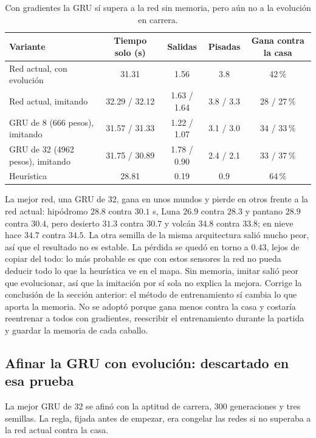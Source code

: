 \documentclass[11pt,letterpaper]{article}
\begin{document}
\begin{table}[h]\centering\small
\begin{tabular}{lcccc}
\toprule
Variante & Tiempo solo (s) & Salidas & Pisadas & Gana contra la casa \\
\midrule
Red actual, con evolución & 31.31 & 1.56 & 3.8 & 42\,\% \\
Red actual, imitando & 32.29 / 32.12 & 1.63 / 1.64 & 3.8 / 3.3 & 28 / 27\,\% \\
GRU de 8 (666 pesos), imitando & 31.57 / 31.33 & 1.22 / 1.07 & 3.1 / 3.0 & 34 / 33\,\% \\
GRU de 32 (4962 pesos), imitando & 31.75 / 30.89 & 1.78 / 0.90 & 2.4 / 2.1 & 33 / 37\,\% \\
\midrule
Heurística & 28.81 & 0.19 & 0.9 & 64\,\% \\
\bottomrule
\end{tabular}
\caption{Con gradientes la GRU sí supera a la red sin memoria, pero aún no a la evolución en carrera.}
\end{table}

La mejor red, una GRU de 32, gana en unos mundos y pierde en otros frente a la red actual: hipódromo $28.8$ contra $30.1$ s, Luna $26.9$ contra $28.3$ y pantano $28.9$ contra $30.4$, pero desierto $31.3$ contra $30.7$ y volcán $34.8$ contra $33.8$; en nieve hace $34.7$ contra $34.5$. La otra semilla de la misma arquitectura salió mucho peor, así que el resultado no es estable. La pérdida se quedó en torno a $0.43$, lejos de copiar del todo: lo más probable es que con estos sensores la red no pueda deducir todo lo que la heurística ve en el mapa. Sin memoria, imitar salió peor que evolucionar, así que la imitación por sí sola no explica la mejora. Corrige la conclusión de la sección anterior: el método de entrenamiento sí cambia lo que aporta la memoria. No se adoptó porque gana menos contra la casa y costaría reentrenar a todos con gradientes, reescribir el entrenamiento durante la partida y guardar la memoria de cada caballo.

\subsection{Afinar la GRU con evolución: descartado en esa prueba}
La mejor GRU de 32 se afinó con la aptitud de carrera, 300 generaciones y tres semillas. La regla, fijada antes de empezar, era congelar las redes si no superaba a la red actual contra la casa.
\end{document}
